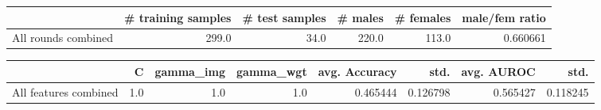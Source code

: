 \begin{tabular}{lrrrrr}
\hline
{} &  \# training samples &  \# test samples &  \# males &  \# females &  male/fem ratio \\
\hline
All rounds combined &               299.0 &            34.0 &    220.0 &      113.0 &        0.660661 \\
\hline
\end{tabular}
\begin{tabular}{lrrrrrrr}
\hline
{} &    C &  gamma\_img &  gamma\_wgt &  avg. Accuracy &      std. &  avg. AUROC &      std. \\
\hline
All features combined &  1.0 &        1.0 &        1.0 &       0.465444 &  0.126798 &    0.565427 &  0.118245 \\
\hline
\end{tabular}

